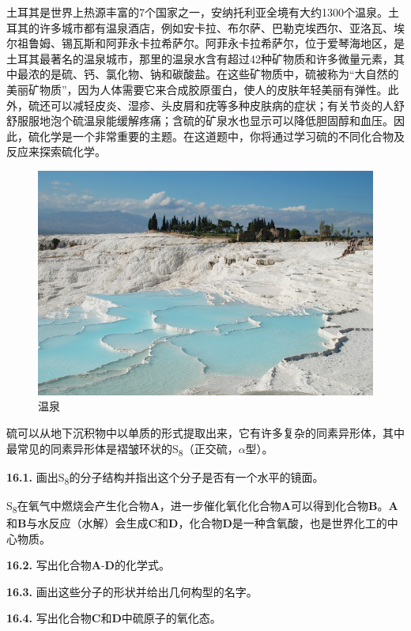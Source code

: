 土耳其是世界上热源丰富的7个国家之一，安纳托利亚全境有大约1300个温泉。土耳其的许多城市都有温泉酒店，例如安卡拉、布尔萨、巴勒克埃西尔、亚洛瓦、埃尔祖鲁姆、锡瓦斯和阿菲永卡拉希萨尔。阿菲永卡拉希萨尔，位于爱琴海地区，是土耳其最著名的温泉城市，那里的温泉水含有超过42种矿物质和许多微量元素，其中最浓的是硫、钙、氯化物、钠和碳酸盐。在这些矿物质中，硫被称为``大自然的美丽矿物质''，因为人体需要它来合成胶原蛋白，使人的皮肤年轻美丽有弹性。此外，硫还可以减轻皮炎、湿疹、头皮屑和疣等多种皮肤病的症状；有关节炎的人舒舒服服地泡个硫温泉能缓解疼痛；含硫的矿泉水也显示可以降低胆固醇和血压。因此，硫化学是一个非常重要的主题。在这道题中，你将通过学习硫的不同化合物及反应来探索硫化学。

\begin{figure}[h]
	\centering
	\includegraphics[width=12cm]{./pic/t16-1.jpg}
	\caption*{温泉}
\end{figure}

硫可以从地下沉积物中以单质的形式提取出来，它有许多复杂的同素异形体，其中最常见的同素异形体是褶皱环状的S\textsubscript{8}（正交硫，$\alpha$型）。

\noindent\textbf{16.1.} 画出S\textsubscript{8}的分子结构并指出这个分子是否有一个水平的镜面。

S\textsubscript{8}在氧气中燃烧会产生化合物\textbf{A}，进一步催化氧化化合物\textbf{A}可以得到化合物\textbf{B}。\textbf{A}和\textbf{B}与水反应（水解）会生成\textbf{C}和\textbf{D}，化合物\textbf{D}是一种含氧酸，也是世界化工的中心物质。

\noindent\textbf{16.2.} 写出化合物\textbf{A}-\textbf{D}的化学式。

\noindent\textbf{16.3.} 画出这些分子的形状并给出几何构型的名字。

\noindent\textbf{16.4.} 写出化合物\textbf{C}和\textbf{D}中硫原子的氧化态。

